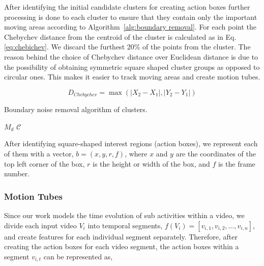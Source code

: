 After identifying the initial candidate clusters for creating action boxes further processing is done to each cluster to ensure that they contain only the important moving areas according to Algorithm~\ref{alg:boundary removal}. For each point the Chebychev distance from the centroid of the cluster is calculated as in
Eq. \ref{eq:chebichev}. We discard the furthest 20\% of the points from the cluster. The reason behind the choice of Chebychev distance over Euclidean distance is due to the possibility of obtaining symmetric square shaped cluster groups as opposed to circular ones. This makes it easier to track moving areas and create motion tubes.

\begin{equation}\label{eq:chebichev}
 D_{Chebychev} = \max(|X_{2} - X_{1}|,|Y_{2}-Y_{1}|)
\end{equation}

\begin{algorithm}
   \caption{Boundary noise removal algorithm of clusters.}
   \label{alg:boundary removal}
    \begin{algorithmic}[1]
    \Require $M_{d}$ 
    \Require $\mathcal{C}$ 
	  \EndIf
	\EndWhile


\end{algorithmic}
\end{algorithm}

After identifying square-shaped interest regions (action boxes), we represent each of them with a vector, $b = (x,y,r,f)$, where $x$ and $y$ are the coordinates
of the top left corner of the box, $r$ is the height or width of the box, and $f$ is the frame number.


\subsubsection{Motion Tubes}
Since our work models the time evolution of sub activities within a video, we divide each input video $V_{i}$ into temporal segments, $f(V_{i}) = [v_{i,1},
v_{i,2}, \dots, v_{i,n}]$,
and create features for each individual segment separately. Therefore, after creating the action boxes for each video segment,
the action boxes within a segment $v_{i,t}$ can be represented as,

